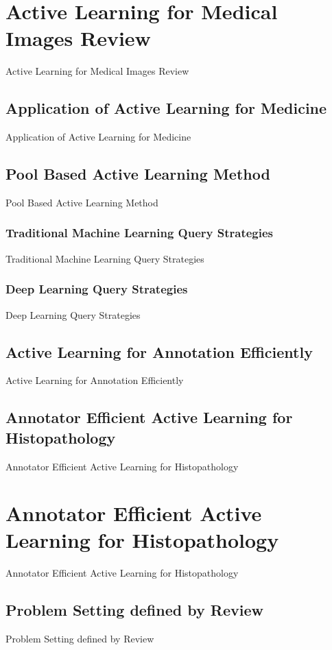 \section{Active Learning for Medical Images Review}
Active Learning for Medical Images Review

\subsection{Application of Active Learning for Medicine}
Application of Active Learning for Medicine

\subsection{Pool Based Active Learning Method}
Pool Based Active Learning Method 

\subsubsection{Traditional Machine Learning Query Strategies}
Traditional Machine Learning Query Strategies

\subsubsection{Deep Learning Query Strategies}
Deep Learning Query Strategies

\subsection{Active Learning for Annotation Efficiently}
Active Learning for Annotation Efficiently

\subsection{Annotator Efficient Active Learning for Histopathology}
Annotator Efficient Active Learning for Histopathology



\section{Annotator Efficient Active Learning for Histopathology}
Annotator Efficient Active Learning for Histopathology

\subsection{Problem Setting defined by Review}
Problem Setting defined by Review

